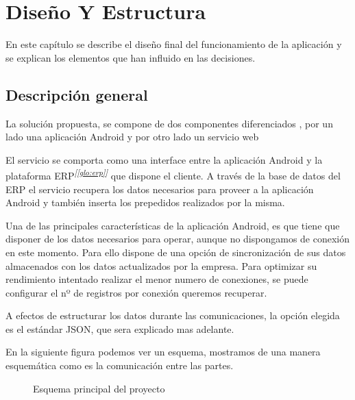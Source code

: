 \chapter{Diseño Y Estructura}

En este capítulo se describe el diseño final del funcionamiento de la aplicación y se explican los elementos que han influido en las decisiones.


\section{Descripción general}
La solución propuesta, se compone de dos componentes diferenciados , por un lado una aplicación Android y por otro lado un servicio web\cite{intWeb}

El servicio se comporta como una interface entre la aplicación Android y la plataforma ERP\textsuperscript{\textit{[\ref{glo:erp}]}} que dispone el cliente. A través de la base de datos del ERP el servicio recupera los datos necesarios para proveer a la aplicación Android y también inserta los prepedidos realizados por la misma.\cite{intErp}

Una de las principales características de la aplicación Android, es que tiene que disponer de los datos necesarios para operar, aunque no dispongamos de conexión en este momento. \cite{int20} Para ello dispone de una opción de sincronización de sus datos almacenados con los datos actualizados por la empresa. Para optimizar su rendimiento intentado realizar el menor numero de conexiones, se puede configurar el nº de registros por conexión queremos recuperar.

A efectos de estructurar los datos durante las comunicaciones, la opción elegida es el estándar JSON, que sera explicado mas adelante. 

En la siguiente figura podemos ver un esquema, mostramos de una manera esquemática como es la comunicación entre las partes.

\begin{figure}[H]
	\centering
	\caption{Esquema principal del proyecto}
	\label{fig:esquema}
\end{figure}


